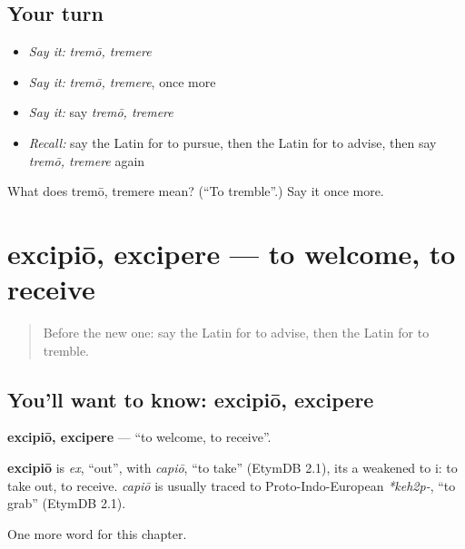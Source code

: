 \subsection*{Your turn}
\begin{itemize}
\raggedright
  \item \emph{Say it:} \emph{tremō, tremere}
  \item \emph{Say it:} \emph{tremō, tremere}, once more
  \item \emph{Say it:} say \emph{tremō, tremere}
  \item \emph{Recall:} say the Latin for to pursue, then the Latin for to advise, then say \emph{tremō, tremere} again
\end{itemize}

\begin{tcolorbox}[breakable,colback=teal!4,colframe=teal!35!black,title={Before you move on}]
What does tremō, tremere mean? (\textquotedblleft{}To tremble\textquotedblright{}.) Say it once more.
\end{tcolorbox}
\section[excipiō, excipere]{excipiō, excipere — to welcome, to receive}

\label{lesson:LA-C202-excipio}



\begin{quote}
Before the new one: say the Latin for to advise, then the Latin for to tremble.
\end{quote}

\subsection*{You'll want to know: excipiō, excipere}
\textbf{excipiō, excipere} — \textquotedblleft{}to welcome, to receive\textquotedblright{}.

\begin{cousinweb}
\textbf{excipiō} is \emph{ex}, \textquotedblleft{}out\textquotedblright{}, with \emph{capiō}, \textquotedblleft{}to take\textquotedblright{} (EtymDB 2.1), its a weakened to i: to take out, to receive. \emph{capiō} is usually traced to Proto-Indo-European \emph{*keh2p-}, \textquotedblleft{}to grab\textquotedblright{} (EtymDB 2.1).
\end{cousinweb}

\begin{grammarlens}[title={What you've built}]
One more word for this chapter.
\end{grammarlens}

